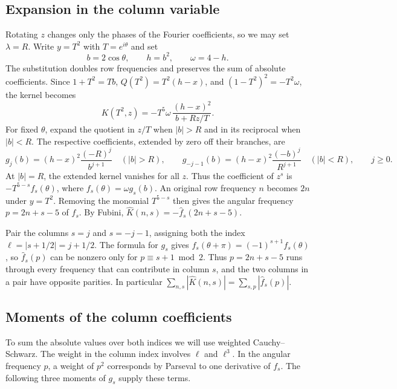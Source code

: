 \documentclass[11pt,reqno]{amsart}
\begin{document}
\subsection*{Expansion in the column variable}
Rotating \(z\) changes only the phases of the Fourier coefficients, so we may set \(\lambda=R\). Write \(y=T^2\) with \(T=e^{i\theta}\) and set
\[
 b=2\cos\theta,\qquad h=b^2,\qquad \omega=4-h .
\]
The substitution doubles row frequencies and preserves the sum of absolute coefficients. Since \(1+T^2=Tb\), \(Q(T^2)=T^2(h-x)\), and \((1-T^2)^2=-T^2\omega\), the kernel becomes
\[
 K(T^2,z)=-T^5\omega\,\frac{(h-x)^2}{b+Rz/T}.
\]
For fixed \(\theta\), expand the quotient in \(z/T\) when \(|b|>R\) and in its reciprocal when \(|b|<R\). The respective coefficients, extended by zero off their branches, are
\[
 g_j(b)=(h-x)^2\frac{(-R)^j}{b^{j+1}}\quad (|b|>R),\qquad
 g_{-j-1}(b)=(h-x)^2\frac{(-b)^j}{R^{j+1}}\quad (|b|<R),
 \qquad j\ge0.
\]
At \(|b|=R\), the extended kernel vanishes for all \(z\). Thus the coefficient of \(z^s\) is \(-T^{5-s}f_s(\theta)\), where \(f_s(\theta)=\omega g_s(b)\). An original row frequency \(n\) becomes \(2n\) under \(y=T^2\). Removing the monomial \(T^{5-s}\) then gives the angular frequency \(p=2n+s-5\) of \(f_s\). By Fubini,
\(\widehat K(n,s)=-\widehat f_s(2n+s-5)\).

Pair the columns \(s=j\) and \(s=-j-1\), assigning both the index \(\ell=|s+1/2|=j+1/2\). The formula for \(g_s\) gives \(f_s(\theta+\pi)=(-1)^{s+1}f_s(\theta)\), so \(\widehat f_s(p)\) can be nonzero only for \(p\equiv s+1\bmod 2\). Thus \(p=2n+s-5\) runs through every frequency that can contribute in column \(s\), and the two columns in a pair have opposite parities. In particular \(\sum_{n,s}|\widehat K(n,s)|=\sum_{s,p}|\widehat f_s(p)|\).

\subsection*{Moments of the column coefficients}
To sum the absolute values over both indices we will use weighted Cauchy--Schwarz. The weight in the column index involves \(\ell\) and \(\ell^3\). In the angular frequency \(p\), a weight of \(p^2\) corresponds by Parseval to one derivative of \(f_s\). The following three moments of \(g_s\) supply these terms.
\end{document}
